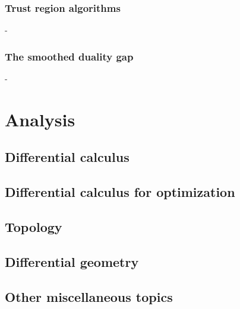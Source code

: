 \documentclass[12pt,openany,oneside]{book}
\theoremstyle{definition}
\numberwithin{exercise}{section}
\numberwithin{definition}{section}
\numberwithin{theorem}{section}
\numberwithin{corollary}{section}
\numberwithin{proposition}{section}
\numberwithin{notation}{section}
\numberwithin{remark}{section}
\numberwithin{hypothesis}{section}
\numberwithin{example}{section}
\begin{document}
\section{Trust region algorithms}-
\section{The smoothed duality gap}-

\part{Analysis}

\chapter{Differential calculus}







\chapter{Differential calculus for optimization}


\chapter{Topology}
\chapter{Differential geometry}
\chapter{Other miscellaneous topics}


\end{document}
